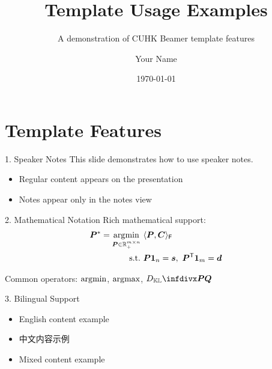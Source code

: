 \documentclass[10pt]{beamer}
\author{
Your Name
}
\title{
Template Usage Examples
}
\subtitle{
A demonstration of CUHK Beamer template features
}
\institute{
Your Institute
}
\date{\today}
\begin{document}
\begin{frame}
    \titlepage
\end{frame}

\section{Template Features}

\begin{frame}{1. Speaker Notes}
    This slide demonstrates how to use speaker notes.
    
    \begin{itemize}
        \item Regular content appears on the presentation
        \item Notes appear only in the notes view
    \end{itemize}
\end{frame}


\begin{frame}{2. Mathematical Notation}
    Rich mathematical support:
    \begin{align}
        \bm{P}^*=\operatorname*{\arg\!min}_{\bm{P}\in\mathbb{R}_+^{m\times n}} & ~ \langle\bm{P},\bm{C}\rangle_\mathsf{F} \\
        \text{s.t.} & ~ \bm{P1}_n = \bm{s},~ \bm{P}^\mathsf{T}\bm{1}_m = \bm{d}
    \end{align}
    
    Common operators: $\operatorname*{\arg\!min}$, $\operatorname*{\arg\!max}$, $\infdiv{\bm{P}}{\bm{Q}}$
\end{frame}


\begin{frame}{3. Bilingual Support}
    \begin{itemize}
        \item English content example
        \item 中文内容示例
        \item Mixed content example
    \end{itemize}
    
    \begin{center}
        \large
    \end{center}
\end{frame}
\end{document}
